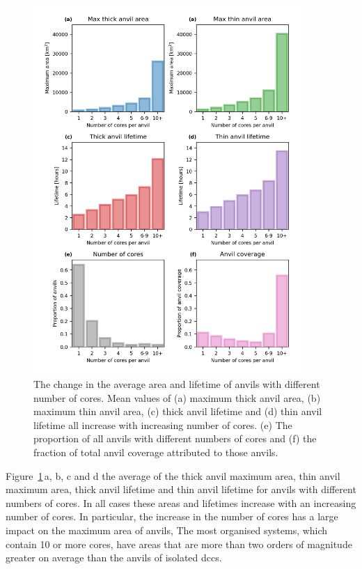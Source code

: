 \begin{figure}[tp]
    \centering
    \includegraphics[width=0.9\textwidth]{figures/chapter2_21.png}
    \caption[
    The change in the average area and lifetime of anvils with different number of cores, and their total area coverage.
    ]{
    The change in the average area and lifetime of anvils with different number of cores. Mean values of (a) maximum thick anvil area, (b) maximum thin anvil area, (c) thick anvil lifetime and (d) thin anvil lifetime all increase with increasing number of cores. (e) The proportion of all anvils with different numbers of cores and (f) the fraction of total anvil coverage attributed to those anvils.}
    \label{fig:anvil_cores_and_coverage}
\end{figure}

Figure~\ref{fig:anvil_cores_and_coverage}\,a, b, c and d the average of the thick anvil maximum area, thin anvil maximum area, thick anvil lifetime and thin anvil lifetime for anvils with different numbers of cores.
In all cases these areas and lifetimes increase with an increasing number of cores.
In particular, the increase in the number of cores has a large impact on the maximum area of anvils, 
The most organised systems, which contain 10 or more cores, have areas that are more than two orders of magnitude greater on average than the anvils of isolated \acrshort{dcc}s.

